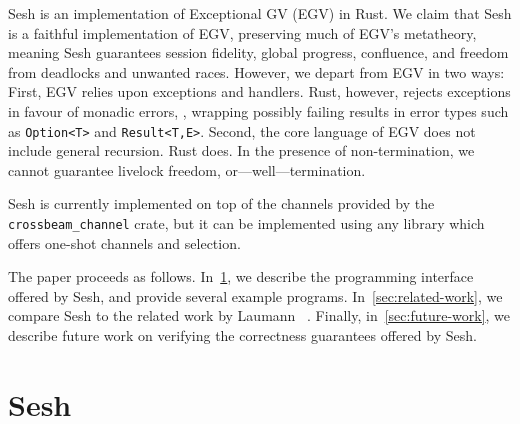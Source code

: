 \documentclass[copyright,creativecommons]{eptcs}
\begin{document}
Sesh is an implementation of Exceptional GV (EGV) in Rust. We claim that Sesh is a faithful implementation of EGV, preserving much of EGV's metatheory, meaning Sesh guarantees session fidelity, global progress, confluence, and freedom from deadlocks and unwanted races. However, we depart from EGV in two ways:
First, EGV relies upon exceptions and handlers. Rust, however, rejects exceptions in favour of monadic errors, \ie, wrapping possibly failing results in error types such as \lstinline{Option<T>} and \lstinline{Result<T,E>}.
Second, the core language of EGV does not include general recursion. Rust does. In the presence of non-termination, we cannot guarantee livelock freedom, or---well---termination.

Sesh is currently implemented on top of the channels provided by the \lstinline{crossbeam_channel} crate, but it can be implemented using any library which offers one-shot channels and selection.

The paper proceeds as follows. In~\cref{sec:contribution}, we describe the programming interface offered by Sesh, and provide several example programs. In~\cref{sec:related-work}, we compare Sesh to the related work by Laumann \etal~\cite{jespersen2015}. Finally, in~\cref{sec:future-work}, we describe future work on verifying the correctness guarantees offered by Sesh.

\section{Sesh}\label{sec:contribution}
\end{document}
